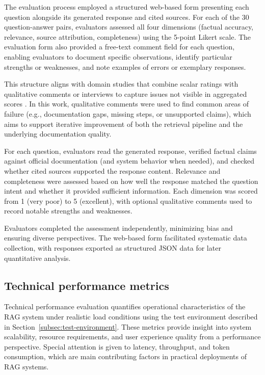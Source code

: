 The evaluation process employed a structured web-based form presenting each question alongside its generated response and cited sources. For each of the 30 question-answer pairs, evaluators assessed all four dimensions (factual accuracy, relevance, source attribution, completeness) using the 5-point Likert scale. The evaluation form also provided a free-text comment field for each question, enabling evaluators to document specific observations, identify particular strengths or weaknesses, and note examples of errors or exemplary responses.

This structure aligns with domain studies that combine scalar ratings with qualitative comments or interviews to capture issues not visible in aggregated scores \parencite{namLoRATunedMultimodalRAG2025}. In this work, qualitative comments were used to find common areas of failure (e.g., documentation gaps, missing steps, or unsupported claims), which aims to support iterative improvement of both the retrieval pipeline and the underlying documentation quality.

For each question, evaluators read the generated response, verified factual claims against official documentation (and system behavior when needed), and checked whether cited sources supported the response content. Relevance and completeness were assessed based on how well the response matched the question intent and whether it provided sufficient information. Each dimension was scored from 1 (very poor) to 5 (excellent), with optional qualitative comments used to record notable strengths and weaknesses.

Evaluators completed the assessment independently, minimizing bias and ensuring diverse perspectives. The web-based form facilitated systematic data collection, with responses exported as structured JSON data for later quantitative analysis.

\subsection{Technical performance metrics}
\label{subsec:technical-performance-metrics}

Technical performance evaluation quantifies operational characteristics of the RAG system under realistic load conditions using the test environment described in Section~\ref{subsec:test-environment}. These metrics provide insight into system scalability, resource requirements, and user experience quality from a performance perspective. Special attention is given to latency, throughput, and token consumption, which are main contributing factors in practical deployments of RAG systems.

